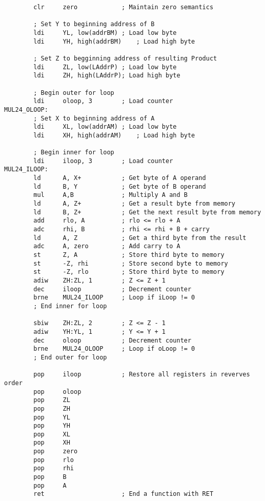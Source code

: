 \documentclass[12pt,letterpaper]{article}
\begin{document}
\begin{verbatim}
        clr     zero            ; Maintain zero semantics

        ; Set Y to beginning address of B
        ldi     YL, low(addrBM) ; Load low byte
        ldi     YH, high(addrBM)    ; Load high byte

        ; Set Z to begginning address of resulting Product
        ldi     ZL, low(LAddrP) ; Load low byte
        ldi     ZH, high(LAddrP); Load high byte

        ; Begin outer for loop
        ldi     oloop, 3        ; Load counter
MUL24_OLOOP:
        ; Set X to beginning address of A
        ldi     XL, low(addrAM) ; Load low byte
        ldi     XH, high(addrAM)    ; Load high byte

        ; Begin inner for loop
        ldi     iloop, 3        ; Load counter
MUL24_ILOOP:
        ld      A, X+           ; Get byte of A operand
        ld      B, Y            ; Get byte of B operand
        mul     A,B             ; Multiply A and B
        ld      A, Z+           ; Get a result byte from memory
        ld      B, Z+           ; Get the next result byte from memory
        add     rlo, A          ; rlo <= rlo + A
        adc     rhi, B          ; rhi <= rhi + B + carry
        ld      A, Z            ; Get a third byte from the result
        adc     A, zero         ; Add carry to A
        st      Z, A            ; Store third byte to memory
        st      -Z, rhi         ; Store second byte to memory
        st      -Z, rlo         ; Store third byte to memory
        adiw    ZH:ZL, 1        ; Z <= Z + 1
        dec     iloop           ; Decrement counter
        brne    MUL24_ILOOP     ; Loop if iLoop != 0
        ; End inner for loop

        sbiw    ZH:ZL, 2        ; Z <= Z - 1
        adiw    YH:YL, 1        ; Y <= Y + 1
        dec     oloop           ; Decrement counter
        brne    MUL24_OLOOP     ; Loop if oLoop != 0
        ; End outer for loop

        pop     iloop           ; Restore all registers in reverves order
        pop     oloop
        pop     ZL
        pop     ZH
        pop     YL
        pop     YH
        pop     XL
        pop     XH
        pop     zero
        pop     rlo
        pop     rhi
        pop     B
        pop     A
        ret                     ; End a function with RET


\end{verbatim}
\end{document}
